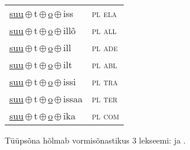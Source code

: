 \begin{minipage}{\textwidth}
\begin{sideways}
\begin{tabular}{l l}
\underline{suu}\,$\oplus$\,t\,$\oplus$\,\underline{o}\,$\oplus$\,iss & \textsc{ pl ela } \\
\underline{suu}\,$\oplus$\,t\,$\oplus$\,\underline{o}\,$\oplus$\,illõ & \textsc{ pl all } \\
\underline{suu}\,$\oplus$\,t\,$\oplus$\,\underline{o}\,$\oplus$\,ill & \textsc{ pl ade } \\
\underline{suu}\,$\oplus$\,t\,$\oplus$\,\underline{o}\,$\oplus$\,ilt & \textsc{ pl abl } \\
\underline{suu}\,$\oplus$\,t\,$\oplus$\,\underline{o}\,$\oplus$\,issi & \textsc{ pl tra } \\
\underline{suu}\,$\oplus$\,t\,$\oplus$\,\underline{o}\,$\oplus$\,issaa & \textsc{ pl ter } \\
\underline{suu}\,$\oplus$\,t\,$\oplus$\,\underline{o}\,$\oplus$\,ika & \textsc{ pl com } \\
\end{tabular}
\end{sideways}
\label{tab:tüüpsõnamall-suuto}

\end{minipage}

 
\vspace{1em}
\noindent Tüüpsõna hõlmab vormisõnastikus 3 lekseemi:  ja .
